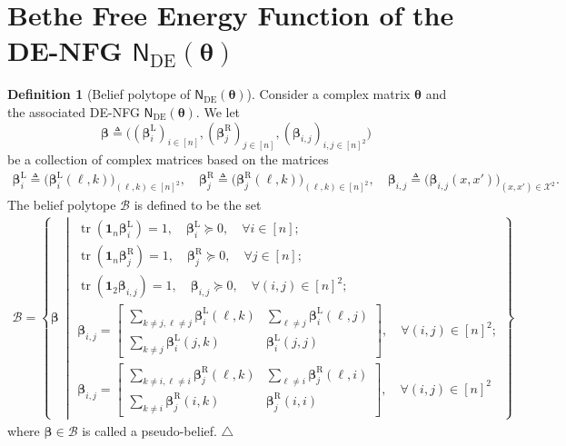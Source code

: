 \documentclass[conference]{IEEEtran}
\theoremstyle{plain}
\theoremstyle{definition}
\newtheorem{definition}[thm]{Definition}
\newcommand{\edefn}{\hfill$\triangle$}
\newcommand{\tr}{\operatorname{tr}}
\newcommand{\sfn}{\mathsf{N}}
\newcommand{\bbeta}{\boldsymbol{\beta}}
\newcommand{\br}[1]{\bbeta^{\mathrm{R}}_{#1}}
\newcommand{\bl}[1]{\bbeta^{\mathrm{L}}_{#1}}
\newcommand{\be}[1]{\bbeta_{#1}}
\newcommand{\btheta}{\boldsymbol{\theta}}
\newcommand{\defeq}{\triangleq}
\newcommand{\sfnDE}{\sfn_{\mathrm{DE}}}
\begin{document}

 \section{Bethe Free Energy Function of the DE-NFG \(\sfnDE(\btheta)\) }\label{appx:Bethe:details}
 \begin{definition}[Belief polytope of $\sfnDE(\btheta)$]\label{def:DENFG:beliefpolytope}
  Consider a complex matrix $\btheta$ and the associated DE-NFG $\sfnDE(\btheta)$. We let
  \[\bbeta\defeq \bigl((\bl{i})_{i\in[n]},(\br{j})_{j\in[n]},(\be{i,j})_{i,j\in [n]^2}\bigr)\]
  be a collection of complex matrices based on the matrices
  \begin{align*}
   \bl{i} \defeq \bigl(\bl{i}(\ell,k) \bigr)_{(\ell,k)\in [n]^2},\quad
   \br{j} \defeq \bigl(\br{j}(\ell,k) \bigr)_{(\ell,k)\in [n]^2},\quad
   \be{i,j} \defeq \bigl(\be{i,j}(x,x') \bigr)_{(x,x')\in\mathcal{X}^2}.
  \end{align*}
  The belief polytope $\mathcal B$ is defined to be the set
  \begin{align*}
   \mathcal B =
   \left\{ \bbeta\ \middle\vert
   \begin{array}{c}
    \tr(\mathbf{1}_{n}\bl{i})=1, \quad \bl{i}\succeq 0, \quad \forall i\in[n];           \\
    \tr(\mathbf{1}_{n}\br{j})=1, \quad \br{j}\succeq 0, \quad \forall j\in[n];           \\
    \tr(\mathbf{1}_{2}\be{i,j})=1, \quad \be{i,j}\succeq 0, \quad \forall (i,j)\in[n]^2; \\[0.5em]
    \be{i,j}=\begin{bmatrix}\sum_{k\neq j,\ell\neq j}\bl{i}(\ell,k)&\sum_{\ell\neq j}\bl{i}(\ell,j)\\\sum_{k\neq j}\bl{i}(j,k)&\bl{i}(j,j)\end{bmatrix},
    \quad \forall (i,j)\in[n]^2;                                                         \\[1.5em]
    \be{i,j}=\begin{bmatrix}\sum_{k\neq i,\ell\neq i}\br{j}(\ell,k)&\sum_{\ell\neq i}\br{j}(\ell,i)\\\sum_{k\neq i}\br{j}(i,k)&\br{j}(i,i)\end{bmatrix},
    \quad \forall (i,j)\in[n]^2
   \end{array}\right\}
  \end{align*}
  where $\bbeta\in\mathcal B$ is called a pseudo-belief.
  \edefn
 \end{definition}
\end{document}
